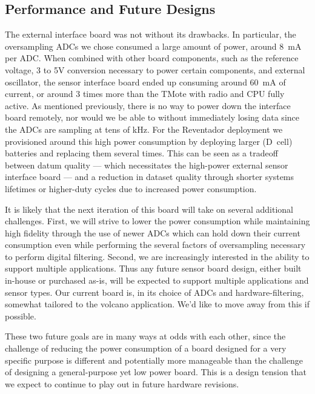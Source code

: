 \subsection{Performance and Future Designs}

The external interface board was not without its drawbacks. In particular,
the oversampling ADCs we chose consumed a large amount of power, around 8~mA
per ADC.  When combined with other board components, such as the reference
voltage, 3 to 5V conversion necessary to power certain components, and
external oscillator, the sensor interface board ended up consuming around
60~mA of current, or around 3 times more than the TMote with radio and CPU
fully active.  As mentioned previously, there is no way to power down the
interface board remotely, nor would we be able to without immediately losing
data since the ADCs are sampling at tens of kHz.  For the Reventador
deployment we provisioned around this high power consumption by deploying
larger (D~cell) batteries and replacing them several times.  This can be seen
as a tradeoff between datum quality --- which necessitates the high-power
external sensor interface board --- and a reduction in dataset quality
through shorter systems lifetimes or higher-duty cycles due to increased
power consumption.

It is likely that the next iteration of this board will take on several
additional challenges. First, we will strive to lower the power consumption
while maintaining high fidelity through the use of newer ADCs which can hold
down their current consumption even while performing the several factors of
oversampling necessary to perform digital filtering.  Second, we are
increasingly interested in the ability to support multiple applications.
Thus any future sensor board design, either built in-house or purchased
as-is, will be expected to support multiple applications and sensor types.
Our current board is, in its choice of ADCs and hardware-filtering,
somewhat tailored to the volcano application. We'd like to move away from
this if possible.

These two future goals are in many ways at odds with each other, since the
challenge of reducing the power consumption of a board designed for a very
specific purpose is different and potentially more manageable than the
challenge of designing a general-purpose yet low power board. This is a
design tension that we expect to continue to play out in future hardware
revisions.
